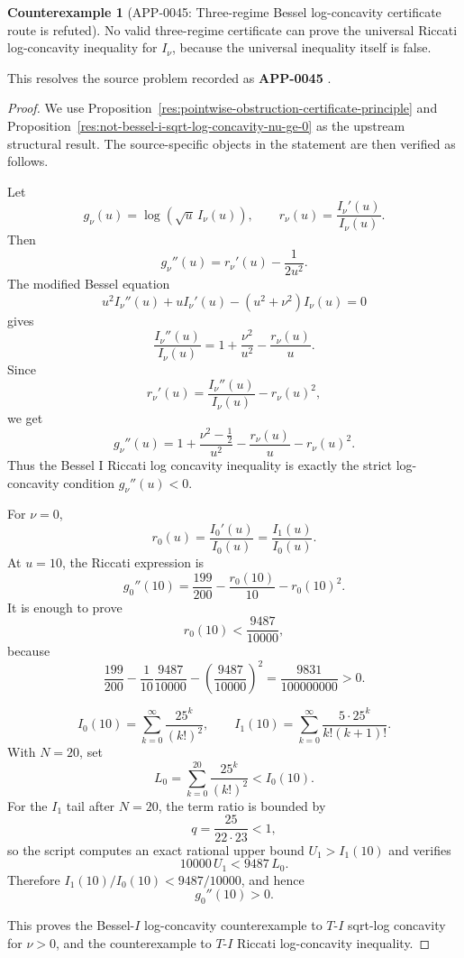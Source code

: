 \documentclass[11pt]{article}
\numberwithin{equation}{section}
\theoremstyle{definition}
\newtheorem{counterexample}[theorem]{Counterexample}
\theoremstyle{remark}
\newcommand{\1}{\mathbf 1}
\begin{document}
\begin{counterexample}[APP-0045: Three-regime Bessel log-concavity certificate route is refuted]
\label{res:not-bessel-i-split-regime-log-concavity-certificate}
No valid three-regime certificate can prove the universal Riccati log-concavity inequality for \(I_\nu\), because the universal inequality itself is false.



This resolves the source problem recorded as \textbf{APP-0045} \cite{app-app-0042-source}.
\end{counterexample}

\begin{proof}
We use Proposition~\ref{res:pointwise-obstruction-certificate-principle} and Proposition~\ref{res:not-bessel-i-sqrt-log-concavity-nu-ge-0} as the upstream structural result. The source-specific objects in the statement are then verified as follows.

Let
\[
g_\nu(u)=\log(\sqrt u\,I_\nu(u)),
\qquad
r_\nu(u)=\frac{I_\nu'(u)}{I_\nu(u)}.
\]
Then
\[
g_\nu''(u)=r_\nu'(u)-\frac{1}{2u^2}.
\]
The modified Bessel equation
\[
u^2I_\nu''(u)+uI_\nu'(u)-(u^2+\nu^2)I_\nu(u)=0
\]
gives
\[
\frac{I_\nu''(u)}{I_\nu(u)}
=1+\frac{\nu^2}{u^2}-\frac{r_\nu(u)}{u}.
\]
Since
\[
r_\nu'(u)=\frac{I_\nu''(u)}{I_\nu(u)}-r_\nu(u)^2,
\]
we get
\[
g_\nu''(u)
=
1+\frac{\nu^2-\frac12}{u^2}
-\frac{r_\nu(u)}{u}
-r_\nu(u)^2.
\]
Thus the Bessel I Riccati log concavity inequality is exactly the strict log-concavity condition \(g_\nu''(u)<0\).

For \(\nu=0\),
\[
r_0(u)=\frac{I_0'(u)}{I_0(u)}=\frac{I_1(u)}{I_0(u)}.
\]
At \(u=10\), the Riccati expression is
\[
g_0''(10)=\frac{199}{200}-\frac{r_0(10)}{10}-r_0(10)^2.
\]
It is enough to prove
\[
r_0(10)<\frac{9487}{10000},
\]
because
\[
\frac{199}{200}
-\frac{1}{10}\frac{9487}{10000}
-\left(\frac{9487}{10000}\right)^2
=\frac{9831}{100000000}>0.
\]

\[
I_0(10)=\sum_{k=0}^{\infty}\frac{25^k}{(k!)^2},
\qquad
I_1(10)=\sum_{k=0}^{\infty}\frac{5\cdot25^k}{k!(k+1)!}.
\]
With \(N=20\), set
\[
L_0=\sum_{k=0}^{20}\frac{25^k}{(k!)^2}<I_0(10).
\]
For the \(I_1\) tail after \(N=20\), the term ratio is bounded by
\[
q=\frac{25}{22\cdot23}<1,
\]
so the script computes an exact rational upper bound \(U_1>I_1(10)\) and verifies
\[
10000\,U_1<9487\,L_0.
\]
Therefore \(I_1(10)/I_0(10)<9487/10000\), and hence
\[
g_0''(10)>0.
\]

This proves the Bessel-\(I\) log-concavity counterexample to \(T\)-\(I\) sqrt-log concavity for \(\nu>0\), and the counterexample to \(T\)-\(I\) Riccati log-concavity inequality.
\end{proof}
\end{document}
